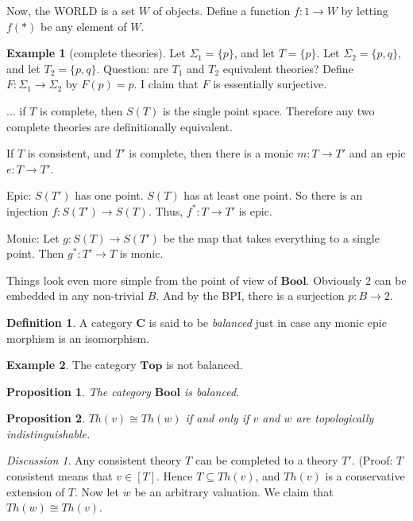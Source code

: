 \documentclass[11pt]{article}
\newtheorem{prop}{Proposition}
\theoremstyle{definition}
\newtheorem*{defn}{Definition}
\newtheorem*{example}{Example}
\theoremstyle{remark}
\newtheorem*{disc}{Discussion}
\begin{document}
Now, the WORLD is a set $W$ of objects.  Define a function $f:1\to W$
by letting $f(*)$ be any element of $W$.  

\begin{example}[complete theories] Let $\Sigma _1=\{ p\}$, and let
  $T=\{ p\}$.  Let $\Sigma _2=\{ p,q\}$, and let $T_2=\{ p,q\}$.
  Question: are $T_1$ and $T_2$ equivalent theories?  Define $F:\Sigma
  _1\to \Sigma _2$ by $F(p)=p$.  I claim that $F$ is essentially
  surjective.


  ... if $T$ is complete, then $S(T)$ is the single point space.
  Therefore any two complete theories are definitionally equivalent.

  If $T$ is consistent, and $T'$ is complete, then there is a monic
  $m:T\to T'$ and an epic $e:T\to T'$.  

  Epic: $S(T')$ has one point.  $S(T)$ has at least one point.  So
  there is an injection $f:S(T')\to S(T)$.  Thus, $f^*:T\to T'$ is
  epic.

  Monic: Let $g:S(T)\to S(T')$ be the map that takes everything to a
  single point.  Then $g^*:T'\to T$ is monic.

  Things look even more simple from the point of view of
  $\mathbf{Bool}$.  Obviously $2$ can be embedded in any non-trivial
  $B$.  And by the BPI, there is a surjection $p:B\to 2$.
\end{example}


\begin{defn} A category $\mathbf{C}$ is said to be \emph{balanced}
  just in case any monic epic morphism is an isomorphism. \end{defn}

\begin{example} The category $\mathbf{Top}$ is not
  balanced. \end{example}


\begin{prop} The category $\mathbf{Bool}$ is balanced. \end{prop}



\begin{prop} $Th(v)\cong Th(w)$ if and only if $v$ and $w$ are
  topologically indistinguishable. \end{prop}

\begin{disc}
  Any consistent theory $T$ can be completed to a theory $T'$.
  (Proof: $T$ consistent means that $v\in [T]$.  Hence $T\subseteq
  Th(v)$, and $Th(v)$ is a conservative extension of $T$.  Now let $w$
  be an arbitrary valuation.  We claim that $Th(w)\cong Th(v)$.  

\end{disc}
\end{document}
